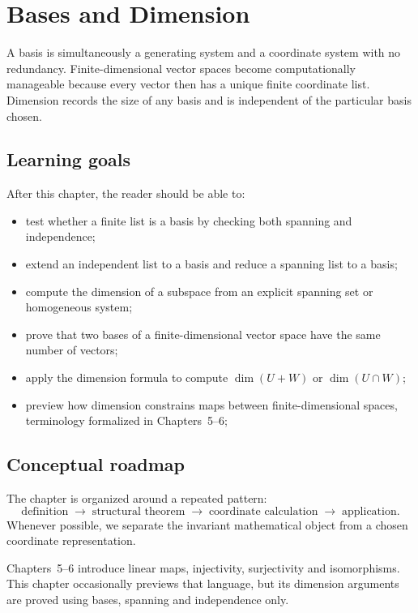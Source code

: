 \chapter{Bases and Dimension}
\label{ch:i03-bases-and-dimension}

A basis is simultaneously a generating system and a coordinate system with no redundancy. Finite-dimensional vector spaces become computationally manageable because every vector then has a unique finite coordinate list. Dimension records the size of any basis and is independent of the particular basis chosen.

\section*{Learning goals}
After this chapter, the reader should be able to:
\begin{itemize}
\item test whether a finite list is a basis by checking both spanning and independence;
\item extend an independent list to a basis and reduce a spanning list to a basis;
\item compute the dimension of a subspace from an explicit spanning set or homogeneous system;
\item prove that two bases of a finite-dimensional vector space have the same number of vectors;
\item apply the dimension formula to compute \(\dim(U+W)\) or \(\dim(U\cap W)\);
\item preview how dimension constrains maps between finite-dimensional spaces, terminology formalized in Chapters~5--6;
\end{itemize}
\section*{Conceptual roadmap}
The chapter is organized around a repeated pattern:
\[
\boxed{\text{definition}\;\longrightarrow\;\text{structural theorem}\;\longrightarrow\;\text{coordinate calculation}\;\longrightarrow\;\text{application}.}
\]
Whenever possible, we separate the invariant mathematical object from a chosen coordinate representation.

\begin{remark}
Chapters~5--6 introduce linear maps, injectivity, surjectivity and isomorphisms.
This chapter occasionally previews that language, but its dimension arguments
are proved using bases, spanning and independence only.
\end{remark}

